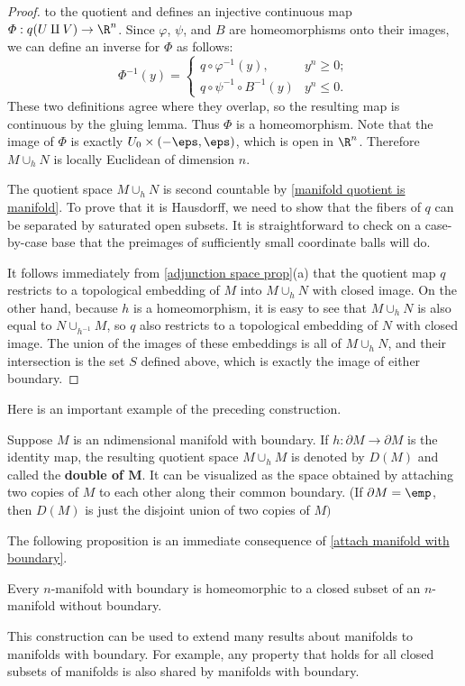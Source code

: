 \begin{proof}
to the quotient and defines an injective continuous map $\varPhi:q(U\amalg V)\to\R^n$. Since $\varphi$, $\psi$, and $B$ are homeomorphisms onto their images, we can define an inverse for $\varPhi$ as follows:
\[\varPhi^{-1}(y)=\begin{cases}
q\circ\varphi^{-1}(y),&y^n\geq 0;\\
q\circ\psi^{-1}\circ B^{-1}(y)&y^n\leq 0.
\end{cases}\]
These two definitions agree where they overlap, so the resulting map is continuous by the gluing lemma. Thus $\varPhi$ is a homeomorphism. Note that the image of $\varPhi$ is exactly $U_0\times(-\eps,\eps)$, which is open in $\R^n$. Therefore $M\cup_hN$ is locally Euclidean of dimension $n$.\par
The quotient space $M\cup_h N$ is second countable by \cref{manifold quotient is manifold}. To prove that it is Hausdorff, we need to show that the fibers of $q$ can be separated by saturated open subsets. It is straightforward to check on a case-by-case base that the preimages of sufficiently small coordinate balls will do.\par
It follows immediately from \cref{adjunction space prop}(a) that the quotient map $q$ restricts to a topological embedding of $M$ into $M\cup_h N$ with closed image. On the other hand, because $h$ is a homeomorphism, it is easy to see that $M\cup_h N$ is also equal to
$N\cup_{h^{-1}}M$, so $q$ also restricts to a topological embedding of $N$ with closed image. The union of the images of these embeddings is all of $M\cup_hN$, and their intersection is the set $S$ defined above, which is exactly the image of either boundary.
\end{proof}
Here is an important example of the preceding construction.
\begin{example}
Suppose $M$ is an ndimensional manifold with boundary. If $h:\partial M\to \partial M$ is the identity map, the resulting quotient space $M\cup_{h}M$ is denoted by $D(M)$ and called the \textbf{double of $\bm{M}$}. It can be visualized as the space obtained by attaching two copies of $M$ to each other along their common boundary. (If $\partial M=\emp$, then $D(M)$ is just the disjoint union of two copies of $M)$
\end{example}
The following proposition is an immediate consequence of \cref{attach manifold with boundary}.
\begin{proposition}
Every $n$-manifold with boundary is homeomorphic to a closed subset of an $n$-manifold without boundary.
\end{proposition}
This construction can be used to extend many results about manifolds to manifolds with boundary. For example, any property that holds for all closed subsets of manifolds is also shared by manifolds with boundary.
